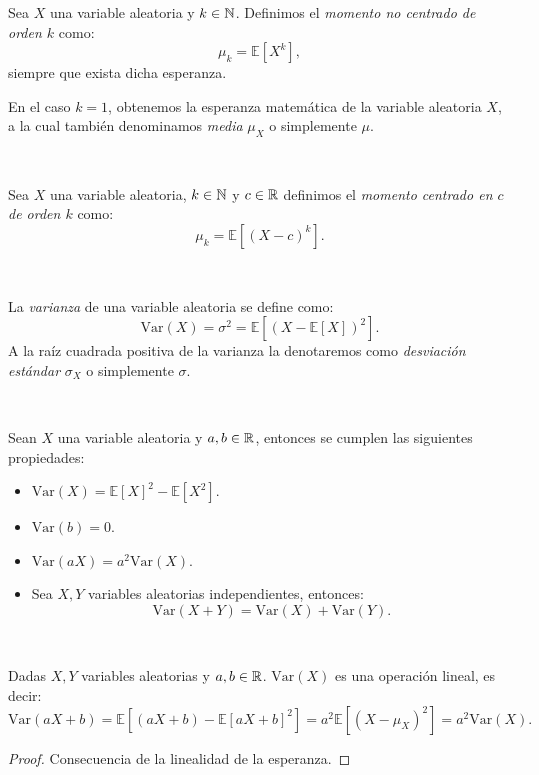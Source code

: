 \documentclass[oneside,openright,titlepage,numbers=noenddot,openany,headinclude,footinclude=true,
cleardoublepage=empty,abstractoff,BCOR=5mm,paper=a4,fontsize=12pt,main=spanish]{scrreprt}
\begin{document}
\begin{definition}
Sea $X$ una variable aleatoria y $k\in \mathbb N$. Definimos el \textit{momento no centrado de orden $k$} como: $$\mu_k=\mathbb{E}[X^k],$$
siempre que exista dicha esperanza.\\
\begin{remark}
En el caso $k=1$, obtenemos la esperanza matemática de la variable aleatoria $X$, a la cual también denominamos \textit{media} $\mu_X$ o simplemente $\mu$.
\end{remark}
\end{definition}\

\begin{definition}
Sea $X$ una variable aleatoria, $k\in \mathbb N$ y $c\in \mathbb{R}$ definimos el \textit{momento centrado en $c$ de orden $k$} como: $$\mu_k=\mathbb{E}[(X-c)^k].$$
\end{definition}\

\begin{definition}[Varianza]
La \textit{varianza} de una variable aleatoria se define como: $$\text{Var}(X)=\sigma
^2=\mathbb{E}\left[(X-\mathbb{E}[X])^2\right].$$
A la raíz cuadrada positiva de la varianza la denotaremos como \textit{desviación estándar} $\sigma_X$ o simplemente $\sigma$.
\end{definition}\

\begin{proposition}
Sean $X$ una variable aleatoria y $a,b\in \mathbb{R}$, entonces se cumplen las siguientes propiedades:
\begin{itemize}
    \item $\text{Var}(X)=\mathbb{E}[X]^2-\mathbb{E}[X^2].$
    \item $\text{Var}(b)=0.$
    \item $\text{Var}(aX)=a^2\text{Var}(X).$
    \item Sea $X,Y$ variables aleatorias independientes, entonces: $$\text{Var}(X+Y)=\text{Var}(X)+\text{Var}(Y).$$
\end{itemize}
\end{proposition}\

\begin{proposition}
Dadas $X,Y$ variables aleatorias y $a,b\in \mathbb{R}$. $\text{Var}(X)$ es una operación lineal, es decir: $$\text{Var}(aX+b)=\mathbb{E}[(aX+b)-\mathbb{E}[aX+b]^2]=a^2\mathbb{E}[(X-\mu_X)^2]=a^2\text{Var}(X).$$ 
\end{proposition}

\begin{proof}
Consecuencia de la linealidad de la esperanza.
\end{proof}\
\end{document}
